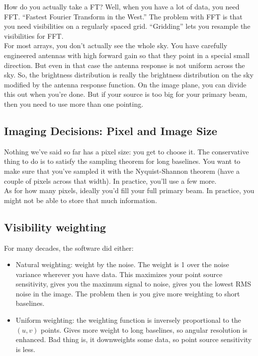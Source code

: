 \documentclass[a4paper]{article}
\begin{document}
How do you actually take a FT? Well, when you have a lot of data, you need FFT. ``Fastest Fourier Transform in the West.'' The problem with FFT is that you need visibilities on a regularly spaced grid. ``Gridding'' lets you resample the visibilities for FFT. \\

For most arrays, you don't actually see the whole sky. You have carefully engineered antennas with high forward gain so that they point in a special small direction. But even in that case the antenna response is not uniform across the sky. So, the brightness distribution is really the brightness distribution on the sky modified by the antenna response function. On the image plane, you can divide this out when you're done. But if your source is too big for your primary beam, then you need to use more than one pointing. 

\subsection{Imaging Decisions: Pixel and Image Size}

Nothing we've said so far has a pixel size: you get to choose it. The conservative thing to do is to satisfy the sampling theorem for long baselines. You want to make sure that you've sampled it with the Nyquist-Shannon theorem (have a couple of pixels across that width). In practice, you'll use a few more.\\

As for how many pixels, ideally you'd fill your full primary beam. In practice, you might not be able to store that much information. \\

\subsection{Visibility weighting}

For many decades, the software did either:

\begin{itemize}

\item Natural weighting: weight by the noise. The weight is 1 over the noise variance wherever you have data. This maximizes your point source sensitivity, gives you the maximum signal to noise, gives you the lowest RMS noise in the image. The problem then is you give more weighting to short baselines. 

\item Uniform weighting: the weighting function is inversely proportional to the $(u,v)$ points. Gives more weight to long baselines, so angular resolution is enhanced. Bad thing is, it downweights some data, so point source sensitivity is less. 

\end{itemize}
\end{document}

